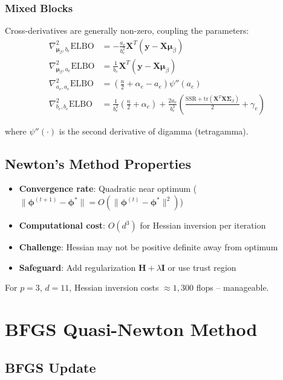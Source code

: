 \documentclass[11pt]{article}
\newcommand{\ELBO}{\text{ELBO}}
\newcommand{\tr}{\text{tr}}
\begin{document}
\subsubsection{Mixed Blocks}

Cross-derivatives are generally non-zero, coupling the parameters:
\begin{align}
\nabla^2_{\bm{\mu}_\beta, b_e} \ELBO &= -\frac{a_e}{b_e^2} \bm{X}^T(\bm{y} - \bm{X}\bm{\mu}_\beta)\\
\nabla^2_{\bm{\mu}_\beta, a_e} \ELBO &= \frac{1}{b_e} \bm{X}^T(\bm{y} - \bm{X}\bm{\mu}_\beta)\\
\nabla^2_{a_e, a_e} \ELBO &= \left(\frac{n}{2} + \alpha_e - a_e\right)\psi''(a_e)\\
\nabla^2_{b_e, b_e} \ELBO &= \frac{1}{b_e^2}\left(\frac{n}{2} + \alpha_e\right) + \frac{2a_e}{b_e^3}\left(\frac{\text{SSR} + \tr(\bm{X}^T\bm{X}\bm{\Sigma}_\beta)}{2} + \gamma_e\right)
\end{align}

where $\psi''(\cdot)$ is the second derivative of digamma (tetragamma).

\subsection{Newton's Method Properties}

\begin{itemize}
\item \textbf{Convergence rate}: Quadratic near optimum ($\|\bm{\phi}^{(t+1)} - \bm{\phi}^*\| = O(\|\bm{\phi}^{(t)} - \bm{\phi}^*\|^2)$)
\item \textbf{Computational cost}: $O(d^3)$ for Hessian inversion per iteration
\item \textbf{Challenge}: Hessian may not be positive definite away from optimum
\item \textbf{Safeguard}: Add regularization $\bm{H} + \lambda \bm{I}$ or use trust region
\end{itemize}

For $p=3$, $d=11$, Hessian inversion costs $\approx 1,300$ flops -- manageable.

\section{BFGS Quasi-Newton Method}

\subsection{BFGS Update}
\end{document}
